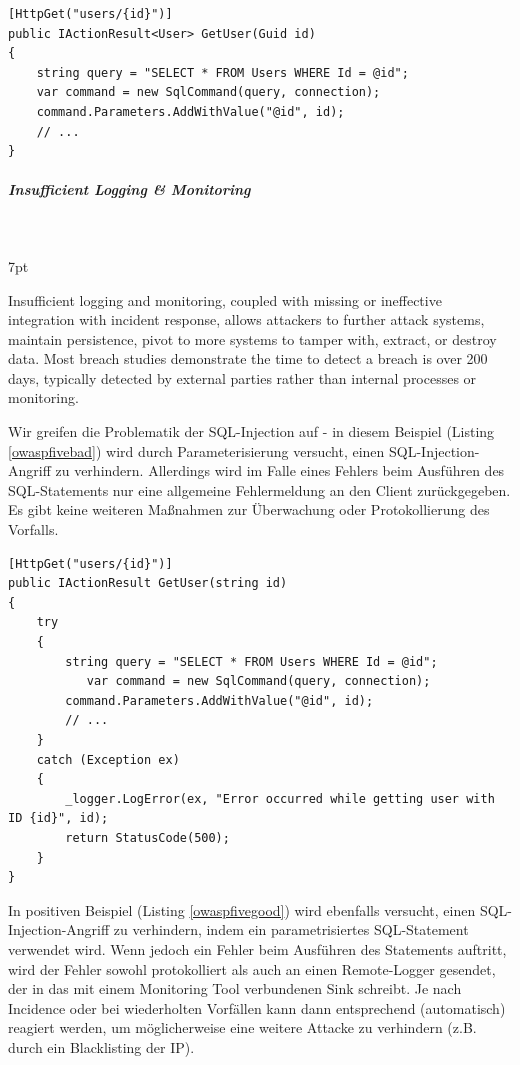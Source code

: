 \documentclass[notitlepage, hidelinks]{article}
\newenvironment{formal}{%
  \def\FrameCommand{%
    \hspace{1pt}%
    {\color{black}\vrule width 2pt}%
    {\color{formalshade}\vrule width 4pt}%
    \colorbox{formalshade}%
  }%
  \MakeFramed{\advance\hsize-\width\FrameRestore}%
  \noindent\hspace{-4.55pt}%
  \begin{adjustwidth}{}{7pt}%
  \vspace{2pt}\vspace{2pt}%
}
{%
  \vspace{2pt}\end{adjustwidth}\endMakeFramed%
}
\begin{document}
\begin{lstlisting}[language={[Sharp]C},frame=single,caption=Positivbeispiel Injection,label=owaspfourgood]
[HttpGet("users/{id}")]
public IActionResult<User> GetUser(Guid id)
{
    string query = "SELECT * FROM Users WHERE Id = @id";
    var command = new SqlCommand(query, connection);
    command.Parameters.AddWithValue("@id", id);
    // ...
}
\end{lstlisting}


\subparagraph{Insufficient Logging \& Monitoring} \mbox{} \\
\begin{formal}
Insufficient logging and monitoring, coupled with missing or ineffective integration with incident response, allows attackers to further attack systems, maintain persistence, pivot to more systems to tamper with, extract, or destroy data. Most breach studies demonstrate the time to detect a breach is over 200 days, typically detected by external parties rather than internal processes or monitoring.
\end{formal}

Wir greifen die Problematik der SQL-Injection auf - in diesem Beispiel (Listing \ref{owaspfivebad}) wird durch Parameterisierung versucht, einen SQL-Injection-Angriff zu verhindern. Allerdings wird im Falle eines Fehlers beim Ausführen des SQL-Statements nur eine allgemeine Fehlermeldung an den Client zurückgegeben. Es gibt keine weiteren Maßnahmen zur Überwachung oder Protokollierung des Vorfalls.

\begin{lstlisting}[language={[Sharp]C},frame=single,caption=Negativbeispiel Improper Assets Management,label=owaspfivebad]
[HttpGet("users/{id}")]
public IActionResult GetUser(string id)
{
    try
    {
        string query = "SELECT * FROM Users WHERE Id = @id";
    	   var command = new SqlCommand(query, connection);
        command.Parameters.AddWithValue("@id", id);
        // ...
    }
    catch (Exception ex)
    {
        _logger.LogError(ex, "Error occurred while getting user with ID {id}", id);
        return StatusCode(500);
    }
}
\end{lstlisting}

In positiven Beispiel (Listing \ref{owaspfivegood}) wird ebenfalls versucht, einen SQL-Injection-Angriff zu verhindern, indem ein parametrisiertes SQL-Statement verwendet wird. Wenn jedoch ein Fehler beim Ausführen des Statements auftritt, wird der Fehler sowohl protokolliert als auch an einen Remote-Logger gesendet, der in das mit einem Monitoring Tool verbundenen Sink schreibt. Je nach Incidence oder bei wiederholten Vorfällen kann dann entsprechend (automatisch) reagiert werden, um möglicherweise eine weitere Attacke zu verhindern (z.B. durch ein Blacklisting der IP).
\end{document}
